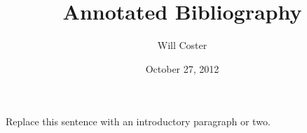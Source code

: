 \documentclass[finalcopy,short]{srpaper}
\title{Annotated Bibliography}
\author{Will Coster}
\date{October 27, 2012}
\begin{document}
\frontmatter

Replace this sentence with an introductory paragraph or two.

\nocite{*}

\end{document}
